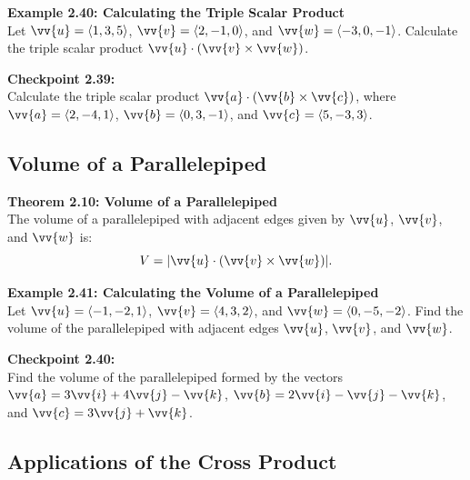 \documentclass{article}
\begin{document}
\begin{examplebox}
    \textbf{Example 2.40: Calculating the Triple Scalar Product} \\
    Let \(\vv{u} = \langle 1, 3, 5 \rangle\), \(\vv{v} = \langle 2, -1, 0 \rangle\), and \(\vv{w} = \langle -3, 0, -1 \rangle\). Calculate the triple scalar product \(\vv{u} \cdot (\vv{v} \times \vv{w})\).
\end{examplebox}

\begin{exercisebox}
    \textbf{Checkpoint 2.39:} \\
    Calculate the triple scalar product \(\vv{a} \cdot (\vv{b} \times \vv{c})\), where \(\vv{a} = \langle 2, -4, 1 \rangle\), \(\vv{b} = \langle 0, 3, -1 \rangle\), and \(\vv{c} = \langle 5, -3, 3 \rangle\).
\end{exercisebox}

\subsection*{Volume of a Parallelepiped}

\begin{theorembox}
    \textbf{Theorem 2.10: Volume of a Parallelepiped} \\
    The volume of a parallelepiped with adjacent edges given by \(\vv{u}\), \(\vv{v}\), and \(\vv{w}\) is:
    \[
    V = |\vv{u} \cdot (\vv{v} \times \vv{w})|.
    \]
\end{theorembox}

\begin{examplebox}
    \textbf{Example 2.41: Calculating the Volume of a Parallelepiped} \\
    Let \(\vv{u} = \langle -1, -2, 1 \rangle\), \(\vv{v} = \langle 4, 3, 2 \rangle\), and \(\vv{w} = \langle 0, -5, -2 \rangle\). Find the volume of the parallelepiped with adjacent edges \(\vv{u}\), \(\vv{v}\), and \(\vv{w}\).
\end{examplebox}

\begin{exercisebox}
    \textbf{Checkpoint 2.40:} \\
    Find the volume of the parallelepiped formed by the vectors \(\vv{a} = 3\vv{i} + 4\vv{j} - \vv{k}\), \(\vv{b} = 2\vv{i} - \vv{j} - \vv{k}\), and \(\vv{c} = 3\vv{j} + \vv{k}\).
\end{exercisebox}

\subsection*{Applications of the Cross Product}
\end{document}
